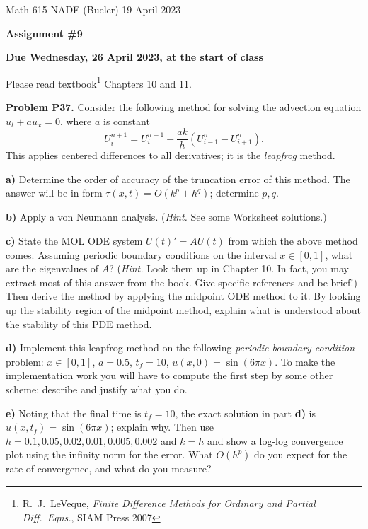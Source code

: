 \documentclass[12pt]{amsart}
\newcommand{\prob}[1]{\bigskip\noindent\textbf{#1}\quad }
\newcommand{\epart}[1]{\medskip\noindent\textbf{#1)}\quad }
\begin{document}
\scriptsize \noindent Math 615 NADE (Bueler) \hfill 19 April 2023
\normalsize

\medskip\bigskip

\Large\centerline{\textbf{Assignment \#9}}
\large
\bigskip

\centerline{\textbf{Due Wednesday, 26 April 2023, at the start of class}}
\bigskip
\normalsize

\thispagestyle{empty}

\bigskip
Please read textbook\footnote{R.~J.~LeVeque, \emph{Finite Difference Methods for Ordinary and Partial Diff.~Eqns.}, SIAM Press 2007} Chapters 10 and 11.


\medskip
\prob{Problem P37.}  Consider the following method for solving the advection equation
$u_t + a u_x = 0$, where $a$ is constant
    $$U_i^{n+1} = U_i^{n-1} - \frac{ak}{h}(U_{i-1}^n - U_{i+1}^n).$$
This applies centered differences to all derivatives; it is the \emph{leapfrog} method.

\epart{a} Determine the order of accuracy of the truncation error of this method.  The answer will be in form $\tau(x,t) = O(k^p + h^q)$; determine $p,q$.

\epart{b} Apply a von Neumann analysis.  (\emph{Hint.}  See some Worksheet solutions.)

\epart{c} State the MOL ODE system $U(t)' = A U(t)$ from which the above method comes.  Assuming periodic boundary conditions on the interval $x\in[0,1]$, what are the eigenvalues of $A$?  (\emph{Hint.}  Look them up in Chapter 10.  In fact, you may extract most of this answer from the book.  Give specific references and be brief!)  Then derive the method by applying the midpoint ODE method to it.  By looking up the stability region of the midpoint method, explain what is understood about the stability of this PDE method.

\epart{d} Implement this leapfrog method on the following \emph{periodic boundary condition} problem:  $x\in[0,1]$, $a = 0.5$, $t_f = 10$, $u(x,0)=\sin(6\pi x)$.  To make the implementation work you will have to compute the first step by some other scheme; describe and justify what you do.

\epart{e} Noting that the final time is $t_f=10$, the exact solution in part \textbf{d)} is $u(x,t_f) = \sin(6\pi x)$; explain why.  Then use $h=0.1,0.05,0.02,0.01,0.005,0.002$ and $k=h$ and show a log-log convergence plot using the infinity norm for the error.  What $O(h^p)$ do you expect for the rate of convergence, and what do you measure?
\end{document}
